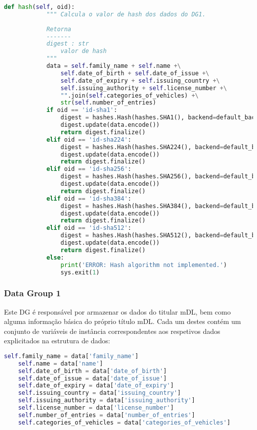 \begin{lstlisting}[caption=API comum aos DG's exemplificada pelo DG1, language=Python]
        def hash(self, oid):
            """ Calcula o valor de hash dos dados do DG1.
    
            Retorna
            -------
            digest : str
                valor de hash
            """
            data = self.family_name + self.name +\
                self.date_of_birth + self.date_of_issue +\
                self.date_of_expiry + self.issuing_country +\
                self.issuing_authority + self.license_number +\
                "".join(self.categories_of_vehicles) +\
                str(self.number_of_entries)
            if oid == 'id-sha1':
                digest = hashes.Hash(hashes.SHA1(), backend=default_backend())
                digest.update(data.encode())
                return digest.finalize()
            elif oid == 'id-sha224':
                digest = hashes.Hash(hashes.SHA224(), backend=default_backend())
                digest.update(data.encode())
                return digest.finalize()
            elif oid == 'id-sha256':
                digest = hashes.Hash(hashes.SHA256(), backend=default_backend())
                digest.update(data.encode())
                return digest.finalize()
            elif oid == 'id-sha384':
                digest = hashes.Hash(hashes.SHA384(), backend=default_backend())
                digest.update(data.encode())
                return digest.finalize()
            elif oid == 'id-sha512':
                digest = hashes.Hash(hashes.SHA512(), backend=default_backend())
                digest.update(data.encode())
                return digest.finalize()
            else:
                print('ERROR: Hash algorithm not implemented.')
                sys.exit(1)
\end{lstlisting}

\subsubsection{Data Group 1}

Este DG é responsável por armazenar os dados do titular mDL, bem como alguma informação básica do próprio título mDL. Cada um destes contém um conjunto de variáveis de instância correspondentes aos respetivos dados explicitados na estrutura de dados:

\begin{lstlisting}[caption=Instanciação das variáveis do DG1, language=Python]
    self.family_name = data['family_name']
    self.name = data['name']
    self.date_of_birth = data['date_of_birth']
    self.date_of_issue = data['date_of_issue']
    self.date_of_expiry = data['date_of_expiry']
    self.issuing_country = data['issuing_country']
    self.issuing_authority = data['issuing_authority']
    self.license_number = data['license_number']
    self.number_of_entries = data['number_of_entries']
    self.categories_of_vehicles = data['categories_of_vehicles']
\end{lstlisting}

